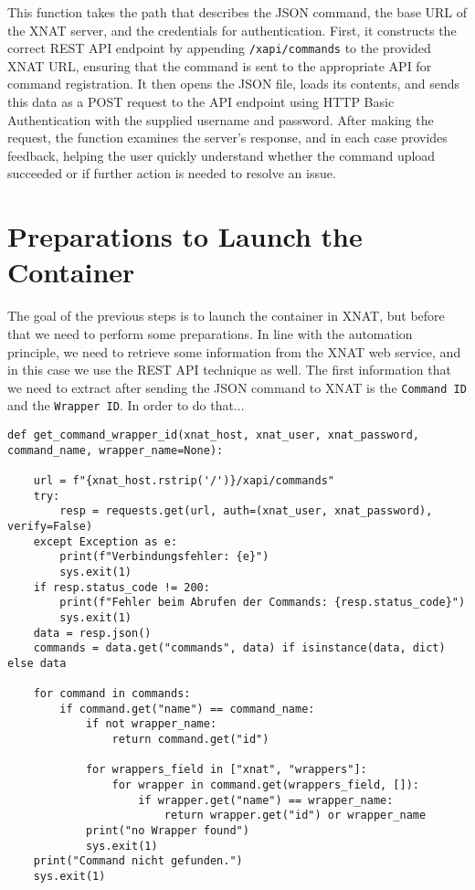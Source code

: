 This function takes the path that describes the JSON command, the base URL of the XNAT server, and the credentials for authentication. First, it constructs the correct REST API endpoint by appending \texttt{/xapi/commands} to the provided XNAT URL, ensuring that the command is sent to the appropriate API for command registration. It then opens the JSON file, loads its contents, and sends this data as a POST request to the API endpoint using \ac{HTTP} Basic Authentication with the supplied username and password. After making the request, the function examines the server’s response, and in each case provides feedback, helping the user quickly understand whether the command upload succeeded or if further action is needed to resolve an issue.

\section{Preparations to Launch the Container}

The goal of the previous steps is to launch the container in XNAT, but before that we need to perform some preparations. In line with the automation principle, we need to retrieve some information from the XNAT web service, and in this case we use the REST API technique as well. The first information that we need to extract after sending the JSON command to XNAT is the \texttt{Command ID} and the \texttt{Wrapper ID}.
In order to do that...
 
\begin{lstlisting}
def get_command_wrapper_id(xnat_host, xnat_user, xnat_password, command_name, wrapper_name=None):
 
    url = f"{xnat_host.rstrip('/')}/xapi/commands"
    try:
        resp = requests.get(url, auth=(xnat_user, xnat_password), verify=False)
    except Exception as e:
        print(f"Verbindungsfehler: {e}")
        sys.exit(1)
    if resp.status_code != 200:
        print(f"Fehler beim Abrufen der Commands: {resp.status_code}")
        sys.exit(1)
    data = resp.json()
    commands = data.get("commands", data) if isinstance(data, dict) else data

    for command in commands:
        if command.get("name") == command_name:
            if not wrapper_name:
                return command.get("id")
            
            for wrappers_field in ["xnat", "wrappers"]:
                for wrapper in command.get(wrappers_field, []):
                    if wrapper.get("name") == wrapper_name:
                        return wrapper.get("id") or wrapper_name
            print("no Wrapper found")
            sys.exit(1)
    print("Command nicht gefunden.")
    sys.exit(1)
\end{lstlisting}

